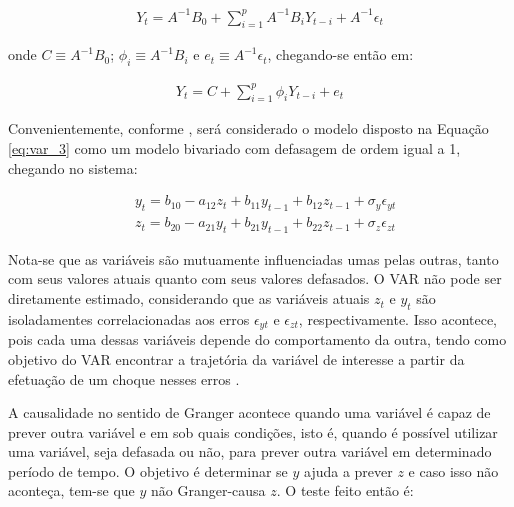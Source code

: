 \begin{ceqn}
\begin{align} \label{eq:var_2}
Y_{t} = A^{-1} B_{0} + \sum_{i=1}^{p}{A^{-1} B_{i} Y_{t-i}} + A^{-1} \epsilon_{t}
\end{align}
\end{ceqn} onde $C \equiv A^{-1} B_{0}$; $\phi_{i} \equiv A^{-1} B_{i}$ e $e_{t} \equiv A^{-1} \epsilon_{t}$, chegando-se então em:

\begin{ceqn}
\begin{align} \label{eq:var_3}
Y_{t} = C + \sum_{i=1}^{p}{\phi_{i} Y_{t-i}} + e_{t}
\end{align}
\end{ceqn}

Convenientemente, conforme , será considerado o modelo disposto na Equação \eqref{eq:var_3} como um modelo bivariado com defasagem de ordem igual a 1, chegando no sistema:

\begin{ceqn}
\begin{align} \label{eq:var_4}
&y_{t} = b_{10} - a_{12} z_{t} + b_{11} y_{t-1} + b_{12} z_{t-1} + \sigma_{y} \epsilon_{yt} \\
&z_{t} = b_{20} - a_{21} y_{t} + b_{21} y_{t-1} + b_{22} z_{t-1} + \sigma_{z} \epsilon_{zt}
\end{align}
\end{ceqn}

Nota-se que as variáveis são mutuamente influenciadas umas pelas outras, tanto com seus valores atuais quanto com seus valores defasados. O VAR não pode ser diretamente estimado, considerando que as variáveis atuais $z_{t}$ e $y_{t}$ são isoladamentes correlacionadas aos erros $\epsilon_{yt}$ e $\epsilon_{zt}$, respectivamente. Isso acontece, pois cada uma dessas variáveis depende do comportamento da outra, tendo como objetivo do VAR encontrar a trajetória da variável de interesse a partir da efetuação de um choque nesses erros \cite{bueno2008}.


A causalidade no sentido de Granger acontece quando uma variável é capaz de prever outra variável e em sob quais condições, isto é, quando é possível utilizar uma variável, seja defasada ou não, para prever outra variável em determinado período de tempo. O objetivo é determinar se $y$ ajuda a prever $z$ e caso isso não aconteça, tem-se que $y$ não Granger-causa $z$. O teste feito então é:

